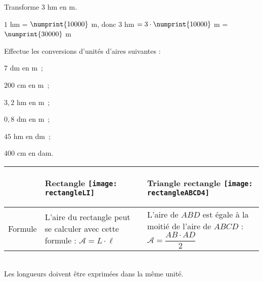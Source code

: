 \vspace{4em}

\begin{methode*1}

\begin{exemple*1}
Transforme $3$ hm en m.

$1$ hm = $\numprint{10000}$ m, donc $3$ hm $= 3 \cdot \numprint{10000}$ m = $\numprint{30000}$ m
\end{exemple*1}

\exercice 
Effectue les conversions d'unités d'aires suivantes :
\begin{colenumerate}{3}
 \item $7$ dm en m ;
 \item $200$ cm en m ;
 \item $3,2$ hm en m ;
 \item $0,8$ dm en m ;
 \item $45$ hm en dm ;
 \item $400$ cm en dam.
 \end{colenumerate}

 \end{methode*1}





\newpage


\begin{aconnaitre}
\begin{tabularx}{\linewidth}{|c|X|X|}
 \cline{2-3}
\multicolumn{1}{c|}{} & \begin{center} \textbf{\textcolor{H1}{Rectangle}} \texttt{[image: rectangleLI]} \end{center} & \begin{center} \textbf{\textcolor{H1}{Triangle rectangle}} \texttt{[image: rectangleABCD4]} \end{center} \\ \hline
Formule & L'aire du rectangle peut se calculer avec cette formule : {\large \textbf{$\mathcal{A} = L \cdot \ell$}} & L'aire de $ABD$ est égale à la moitié de l'aire de $ABCD$ : {\large \textbf{$\mathcal{A} = \dfrac{AB \cdot AD}{2}$}} \phantom{retourligne} \\\hline
 \end{tabularx} \\[1em]
Les longueurs doivent être exprimées dans la même unité.
\end{aconnaitre}



